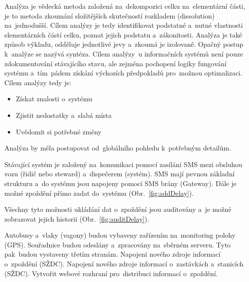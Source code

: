 

Analýza je vědecká metoda založená na~dekompozici celku na~elementární části, je to metoda
zkoumání složitějších skutečností rozkladem (dissolution) na~jednodušší. Cílem analýzy je tedy identifikovat podstatné a~nutné vlastnosti elementárních částí celku, poznat jejich podstatu a~zákonitosti. Analýza je také způsob výkladu, odděluje jednotlivé jevy a~zkoumá je izolovaně. Opačný postup k~analýze se nazývá syntéza. Cílem analýzy~u informačních systémů není pouze zdokumentování stávajícího stavu, ale zejména pochopení logiky fungování systému a~tím~pádem získání výchozích předpokladů pro~možnou optimalizaci.
Cílem analýzy tedy je:
\begin{itemize}
	\setlength{\parskip}{0pt}
	\setlength{\itemsep}{0pt}
	\item Získat znalosti o~systému
	\item Zjistit nedostatky a~slabá místa
	\item Uvědomit si potřebné změny
\end{itemize}
Analýza by měla postupovat od~globálního pohledu k~potřebným detailům.



Stávající systém je založený na~komunikaci pomocí zasílání SMS mezi obsluhou vozu (řidič nebo steward) a~dispečerem (systém). SMS mají pevnou základní strukturu a~do systému jsou napojeny pomocí SMS brány (Gateway). Dále je možné zpoždění přímo zadat do~systému (Obr.~\ref{fig:addDelay}).

Všechny tyto možnosti ukládání dat o~zpoždění jsou auditovány a~je možné zobrazovat jejich historii (Obr.~\ref{fig:auditDelay}).


Autobusy a~vlaky (vagony) budou vybaveny zařízením na~monitoring polohy (GPS).
Souřadnice budou odeslány a~zpracovány na~sběrném serveru. Tyto pak~budou vystaveny třetím stranám.
Napojení nového zdroje informací o~zpoždění (SŽDC). Napojení nového zdroje informací o~zastávkách a~stanicích (SŽDC). Vytvořit webové rozhraní pro~distribuci informací o~zpoždění.

